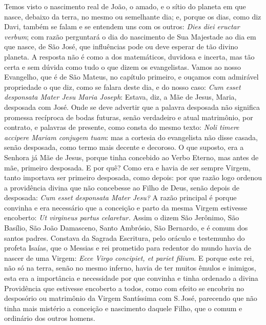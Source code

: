 Temos visto o nascimento real de João, o amado, e o sítio do planeta em
que nasce, debaixo da terra, no mesmo ou semelhante dia; e, porque os
dias, como diz Davi, também se falam e se entendem uns com os outros:
\emph{Dies diei eructar verbum}; com razão perguntará o dia do
nascimento de Sua Majestade ao dia em que nasce, de São José, que
influências pode ou deve esperar de tão divino planeta. A resposta não é
como a dos matemáticos, duvidosa e incerta, mas tão certa e sem dúvida
como tudo o que dizem os evangelistas. Vamos ao nosso Evangelho, que é
de São Mateus, no capítulo primeiro, e ouçamos com admirável propriedade
o que diz, como se falara deste dia, e do nosso caso: \emph{Cum esset
desponsata Mater Jesu Maria Joseph}: Estava, diz, a Mãe de
Jesus, Maria, desposada com José. Onde se deve advertir que a palavra
desposada não significa promessa recíproca de bodas futuras, senão
verdadeiro e atual matrimônio, por contrato, e palavras de presente,
como consta do mesmo texto: \emph{Noli timere accipere Mariam conjugem
tuam}: mas a cortesia do evangelista não disse casada, senão
desposada, como termo mais decente e decoroso. O que suposto, era a
Senhora já Mãe de Jesus, porque tinha concebido ao Verbo Eterno, mas
antes de mãe, primeiro desposada. E por quê? Como era e havia de ser
sempre Virgem, tanto importava ser primeiro desposada, como depois: por
que razão logo ordenou a providência divina que não concebesse ao Filho
de Deus, senão depois de desposada: \emph{Cum esset desponsata Mater
Jesu?} A razão principal é porque convinha e era necessário que a
conceição e parto da mesma Virgem estivesse encoberto: \emph{Ut
virgineus partus celaretur.} Assim o dizem São Jerônimo, São Basílio,
São João Damasceno, Santo Ambrósio, São Bernardo, e é comum dos santos
padres. Constava da Sagrada Escritura, pelo oráculo e testemunho do
profeta Isaías, que o Messias e rei prometido para redentor do mundo
havia de nascer de uma Virgem: \emph{Ecce Virgo concipiet, et pariet
filium}. E porque este rei, não só na terra, senão no mesmo
inferno, havia de ter muitos êmulos e inimigos, esta era a importância e
necessidade por que convinha e tinha ordenado a divina Providência que
estivesse encoberto a todos, como com efeito se encobriu no desposório
ou matrimônio da Virgem Santíssima com S.\,José, parecendo que não tinha
mais mistério a conceição e nascimento daquele Filho, que o comum e
ordinário dos outros homens.

